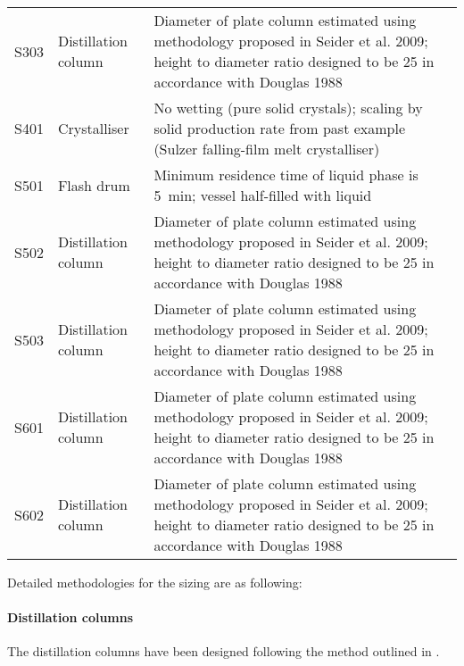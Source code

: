 \begin{table}[h]
\begin{tabularx}{\linewidth}{llXl}
S303 & Distillation column  & Diameter of plate column estimated using methodology proposed in Seider et al. 2009; height to diameter ratio designed to be 25 in accordance with Douglas 1988 & \cite{seider_product_2009,douglas_conceptual_1988} \\
S401 & Crystalliser         & No wetting (pure solid crystals); scaling by solid production rate from past example (Sulzer falling-film melt crystalliser)                                    & \cite{seader_separation_2011}                      \\
S501 & Flash drum           & Minimum residence time of liquid phase is \SI{5}{\minute}; vessel half-filled with liquid                                                                                 & \cite{seader_separation_2011}                      \\
S502 & Distillation column  & Diameter of plate column estimated using methodology proposed in Seider et al. 2009; height to diameter ratio designed to be 25 in accordance with Douglas 1988 & \cite{seider_product_2009,douglas_conceptual_1988} \\
S503 & Distillation column  & Diameter of plate column estimated using methodology proposed in Seider et al. 2009; height to diameter ratio designed to be 25 in accordance with Douglas 1988 & \cite{seider_product_2009,douglas_conceptual_1988} \\
S601 & Distillation  column & Diameter of plate column estimated using methodology proposed in Seider et al. 2009; height to diameter ratio designed to be 25 in accordance with Douglas 1988 & \cite{seider_product_2009,douglas_conceptual_1988} \\
S602 & Distillation  column & Diameter of plate column estimated using methodology proposed in Seider et al. 2009; height to diameter ratio designed to be 25 in accordance with Douglas 1988 & \cite{seider_product_2009,douglas_conceptual_1988} \\ \bottomrule
\end{tabularx}
\end{table}

Detailed methodologies for the sizing are as following:

\paragraph{Distillation columns}
The distillation columns have been designed following the method outlined in \textcite{seider_product_2009}.

